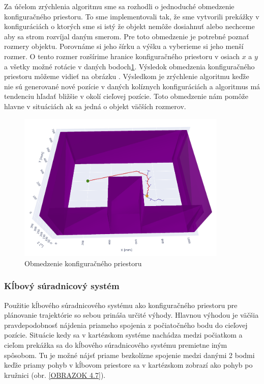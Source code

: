  Za účelom zrýchlenia algoritmu sme sa rozhodli o jednoduché obmedzenie konfiguračného priestoru. To sme implementovali tak, že sme vytvorili prekážky v konfiguráciách o ktorých sme si istý že objekt nemôže dosiahnuť alebo nechceme aby sa strom rozvíjal daným smerom. Pre toto obmedzenie je potrebné poznať rozmery objektu. Porovnáme si jeho šírku a výšku a vyberieme si jeho menší rozmer. O tento rozmer rozšírime hranice konfiguračného priestoru v osiach $ x $ a $ y $ a všetky možné rotácie v daných bodoch\ref{OBRAZOK 4.6}. Výsledok obmedzenia konfiguračného priestoru môžeme vidieť na obrázku . Výsledkom je zrýchlenie algoritmu keďže nie sú generované nové pozície v daných kolíznych konfiguráciách a algoritmus má tendenciu hľadať bližšie v okolí cieľovej pozície. Toto obmedzenie nám pomôže hlavne v situáciách ak sa jedná o objekt väčších rozmerov. 
 
  \begin{figure}[h!]
 	\centering
 	\includegraphics[width=100mm]{img/ObmedzenieCfree.png}
 	\caption{Obmedzenie konfiguračného priestoru} \label{OBRAZOK 4.6} 
 \end{figure}
 
\subsubsection{Kĺbový súradnicový systém}

Použitie kĺbového súradnicového systému ako konfiguračného priestoru pre plánovanie trajektórie so sebou prináša určité výhody. Hlavnou výhodou je väčšia pravdepodobnosť nájdenia priameho spojenia z počiatočného bodu do cieľovej pozície. Situácie kedy sa v kartézskom systéme nachádza medzi počiatkom a cieľom prekážka sa do kĺbového súradnicového systému premietne iným spôsobom. Tu je možné nájsť priame bezkolízne spojenie medzi danými 2 bodmi keďže priamy pohyb v kĺbovom priestore sa v kartézskom zobrazí ako pohyb po kružnici (obr. \ref{OBRAZOK 4.7}).  \newline

